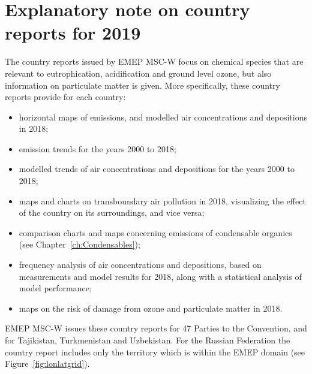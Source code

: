 \setcounter{page}{1}

\cleardoublepage
\chapter[2019 Country Reports]{Explanatory note on country reports for 2019}
\label{ch:appx_countryrep_2019}



The country reports issued by EMEP MSC-W \citep{Klein:2020} focus on chemical species that are relevant to eutrophication, acidification and ground level ozone, but also information on particulate matter is given. More specifically, these country reports provide for each country:
\begin{itemize}
\item horizontal maps of emissions, and modelled air concentrations and depositions in 2018;
\item emission trends for the years 2000 to 2018;
\item modelled trends of air concentrations and depositions for the years 2000 to 2018;
\item maps and charts on transboundary air pollution in 2018, visualizing the effect of the country on its surroundings, and vice versa;
\item comparison charts and maps concerning emissions of condensable organics (see Chapter~\ref{ch:Condensables});
\item frequency analysis of air concentrations and depositions, based on measurements and model results for 2018, along with a statistical analysis of model performance;
\item maps on the risk of damage from ozone and particulate matter in 2018.
\end{itemize}

EMEP MSC-W issues these country reports for 47 Parties to the Convention, and for Tajikistan, Turkmenistan and Uzbekistan. For the Russian Federation the country report includes only the territory which is within the EMEP domain (see Figure~\ref{fig:lonlatgrid}).

